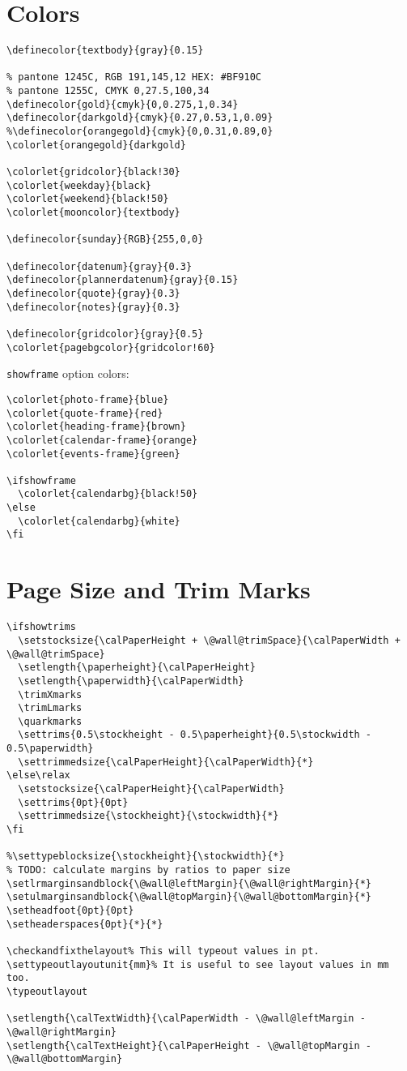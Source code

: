 \documentclass[11pt,oneside]{memoir-article}
\begin{document}
\section{Colors}
\label{sec:orgce34dfd}

\begin{verbatim}
\definecolor{textbody}{gray}{0.15}

% pantone 1245C, RGB 191,145,12 HEX: #BF910C
% pantone 1255C, CMYK 0,27.5,100,34
\definecolor{gold}{cmyk}{0,0.275,1,0.34}
\definecolor{darkgold}{cmyk}{0.27,0.53,1,0.09}
%\definecolor{orangegold}{cmyk}{0,0.31,0.89,0}
\colorlet{orangegold}{darkgold}

\colorlet{gridcolor}{black!30}
\colorlet{weekday}{black}
\colorlet{weekend}{black!50}
\colorlet{mooncolor}{textbody}

\definecolor{sunday}{RGB}{255,0,0}

\definecolor{datenum}{gray}{0.3}
\definecolor{plannerdatenum}{gray}{0.15}
\definecolor{quote}{gray}{0.3}
\definecolor{notes}{gray}{0.3}

\definecolor{gridcolor}{gray}{0.5}
\colorlet{pagebgcolor}{gridcolor!60}
\end{verbatim}

\texttt{showframe} option colors:

\begin{verbatim}
\colorlet{photo-frame}{blue}
\colorlet{quote-frame}{red}
\colorlet{heading-frame}{brown}
\colorlet{calendar-frame}{orange}
\colorlet{events-frame}{green}

\ifshowframe
  \colorlet{calendarbg}{black!50}
\else
  \colorlet{calendarbg}{white}
\fi
\end{verbatim}

\section{Page Size and Trim Marks}
\label{sec:org674f3ac}

\begin{verbatim}
\ifshowtrims
  \setstocksize{\calPaperHeight + \@wall@trimSpace}{\calPaperWidth + \@wall@trimSpace}
  \setlength{\paperheight}{\calPaperHeight}
  \setlength{\paperwidth}{\calPaperWidth}
  \trimXmarks
  \trimLmarks
  \quarkmarks
  \settrims{0.5\stockheight - 0.5\paperheight}{0.5\stockwidth - 0.5\paperwidth}
  \settrimmedsize{\calPaperHeight}{\calPaperWidth}{*}
\else\relax
  \setstocksize{\calPaperHeight}{\calPaperWidth}
  \settrims{0pt}{0pt}
  \settrimmedsize{\stockheight}{\stockwidth}{*}
\fi

%\settypeblocksize{\stockheight}{\stockwidth}{*}
% TODO: calculate margins by ratios to paper size
\setlrmarginsandblock{\@wall@leftMargin}{\@wall@rightMargin}{*}
\setulmarginsandblock{\@wall@topMargin}{\@wall@bottomMargin}{*}
\setheadfoot{0pt}{0pt}
\setheaderspaces{0pt}{*}{*}

\checkandfixthelayout% This will typeout values in pt.
\settypeoutlayoutunit{mm}% It is useful to see layout values in mm too.
\typeoutlayout

\setlength{\calTextWidth}{\calPaperWidth - \@wall@leftMargin - \@wall@rightMargin}
\setlength{\calTextHeight}{\calPaperHeight - \@wall@topMargin - \@wall@bottomMargin}
\end{verbatim}
\end{document}
